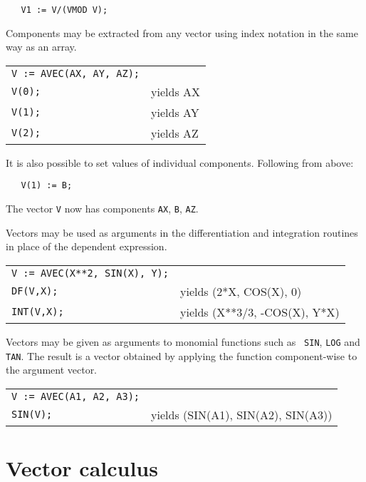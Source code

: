 \begin{verbatim}
   V1 := V/(VMOD V);
\end{verbatim}

Components may be extracted from any vector using index notation
in the same way as an array.

\begin{tabular}{l l}
{\tt V := AVEC(AX, AY, AZ);} & \\
{\tt V(0);} & yields AX \\
{\tt V(1);} & yields AY \\
{\tt V(2);} & yields AZ \\
\end{tabular}

It is also possible to set values of individual components. Following
from above:

\begin{verbatim}
   V(1) := B;
\end{verbatim}

The vector {\tt V} now has components {\tt AX}, {\tt B}, {\tt AZ}.

Vectors may be used as arguments in the differentiation and
integration routines in place of the dependent expression.

\begin{tabular}{l l}
{\tt V := AVEC(X**2, SIN(X), Y);} & \\
{\tt DF(V,X);} & yields (2*X, COS(X), 0) \\
{\tt INT(V,X);} & yields (X**3/3, -COS(X), Y*X) \\
\end{tabular}

Vectors may be given as arguments to monomial functions such as {\tt
SIN}, {\tt LOG} and {\tt TAN}. The result is a vector obtained by
applying the function component-wise to the argument vector.

\begin{tabular}{l l}
{\tt V := AVEC(A1, A2, A3);} & \\
{\tt SIN(V);} & yields (SIN(A1), SIN(A2), SIN(A3)) \\
\end{tabular}

\section{Vector calculus}


